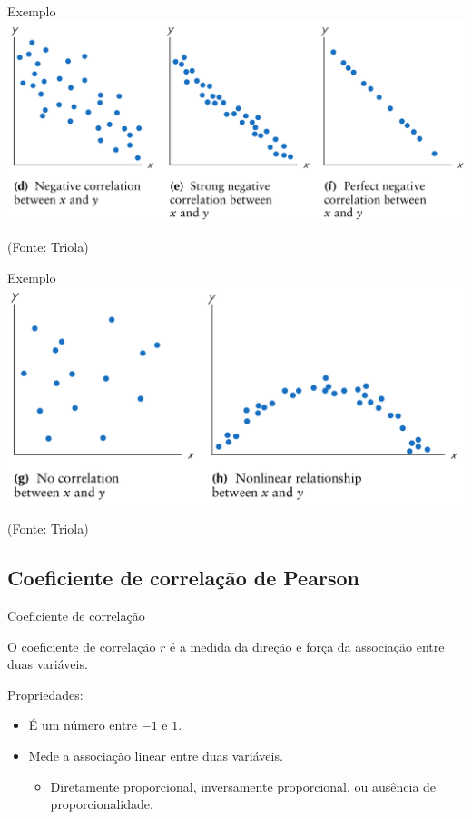 \documentclass{beamer}
\begin{document}
\begin{frame}{Exemplo}
  \includegraphics[height=0.6\textheight]{Cap17/negative}

  (Fonte: Triola)
\end{frame}

\begin{frame}{Exemplo}
  \includegraphics[height=0.6\textheight]{Cap17/other}

  (Fonte: Triola)
\end{frame}


\subsection[Pearson]{Coeficiente de correlação de Pearson}

\begin{frame}{Coeficiente de correlação}
  \begin{definition}
    O coeficiente de correlação $r$ é a medida da direção e força da
    associação entre duas variáveis.
  \end{definition}
  Propriedades:
  \begin{itemize}
  \item É um número entre $-1$ e $1$.
  \item Mede a associação \alert{linear} entre duas variáveis.
    \begin{itemize}
    \item Diretamente proporcional, inversamente proporcional, ou
      ausência de proporcionalidade.
    \end{itemize}
  \end{itemize}
\end{frame}
\end{document}
